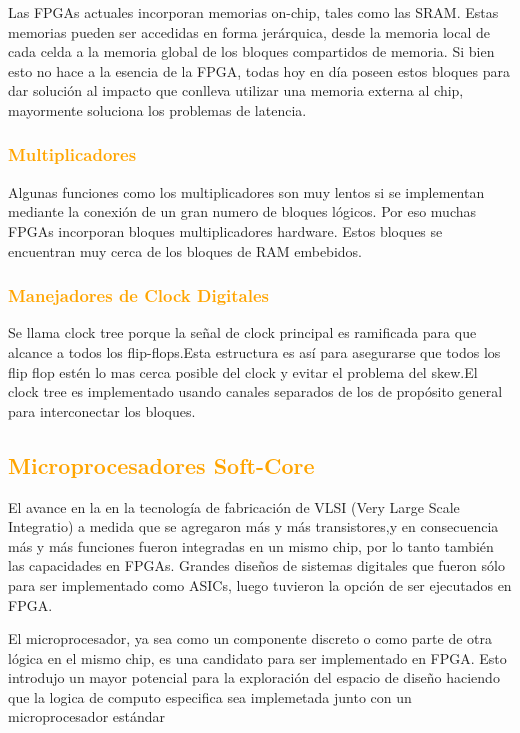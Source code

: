 \documentclass[a4paper,11pt]{article}
\begin{document}
Las FPGAs actuales incorporan memorias on-chip, tales como las SRAM. Estas memorias pueden ser accedidas en forma jerárquica, desde la memoria local de cada celda a la memoria global de los bloques compartidos de memoria. Si bien esto no hace a la esencia de la FPGA, todas hoy en día poseen estos bloques para dar solución al impacto que conlleva utilizar una memoria externa al chip, mayormente soluciona los problemas de latencia.

		\subsubsection{\textcolor{orange}{Multiplicadores}}
Algunas funciones como los multiplicadores son muy lentos si se implementan mediante la conexión de un gran numero de bloques lógicos. Por eso muchas FPGAs incorporan bloques multiplicadores hardware. Estos bloques se encuentran muy cerca de los bloques de RAM embebidos. 
\subsubsection{\textcolor{orange}{Manejadores de Clock Digitales}}
 Se llama clock tree porque la señal de clock principal es ramificada para que alcance a todos los flip-flops.Esta estructura es así para asegurarse que todos los flip flop estén lo mas cerca posible del clock y evitar el problema del skew.El clock tree es implementado usando canales separados de los de propósito general para interconectar los bloques.

		\subsection{\textcolor{orange}{Microprocesadores Soft-Core }}

El avance en la en la tecnología de fabricación de VLSI (Very Large Scale Integratio) a medida que se agregaron más y más transistores,y en consecuencia más y más funciones fueron integradas en un mismo chip, por lo tanto también las capacidades en FPGAs. Grandes diseños de sistemas digitales que fueron sólo para ser implementado como ASICs, luego tuvieron la opción de ser ejecutados en FPGA.

El microprocesador, ya sea como un componente discreto o  como parte de otra lógica en el mismo chip, es una candidato  para ser  implementado en FPGA. Esto introdujo un mayor potencial para la exploración del espacio de diseño haciendo que la logica de computo especifica sea implemetada junto con un microprocesador estándar %
		
\end{document}
